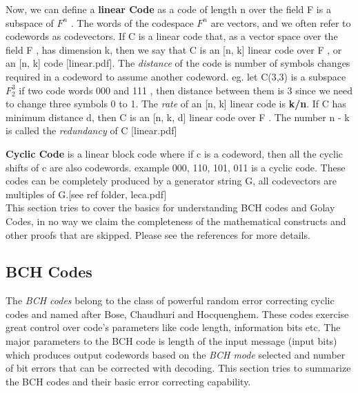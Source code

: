 Now, we can define a \textbf{linear Code} as a code of length n over the field F is a subspace of $F^n$ . The words of the codespace $F^n$ are vectors, and we often refer to codewords as codevectors.
If C is a linear code that, as a vector space over the field F , has dimension k,
then we say that C is an [n, k] linear code over F , or an [n, k] code [linear.pdf]. The \emph{distance} of the code is number of symbols changes required in a codeword to assume another codeword. eg. let C(3,3) is a subspace $F_2^3$ if two code words 000 and 111 , then distance between them is 3 since we need to change three symbols 0 to 1.
The \emph{rate} of an [n, k] linear code is \textbf{k/n}. If C has minimum distance d, then C is an [n, k, d] linear code over F .
The number n - k is called the \emph{redundancy} of C [linear.pdf]

\textbf{Cyclic Code} is a linear block code where if c is a codeword, then all the cyclic shifts of c are also codewords.
example {000, 110, 101, 011} is a cyclic code.
These codes can be completely produced by a generator string G, all codevectors are multiples of G.[see ref folder, leca.pdf]\\

This section tries to cover the basics for understanding BCH codes and Golay Codes, in no way we claim the completeness of the mathematical constructs and other proofs that are skipped. Please see the references for more details.\\

\subsection{BCH Codes}
The \emph{BCH codes} belong to the class of powerful random error correcting cyclic codes and named after Bose, Chaudhuri and Hocquenghem. These codes exercise great control over code's parameters like code length, information bits etc. The major parameters to the BCH code is length of the input message (input bits) which produces output codewords based on the \emph{BCH mode} selected and number of bit errors that can be corrected with decoding. This section tries to summarize the BCH codes and
their basic error correcting capability.\\

